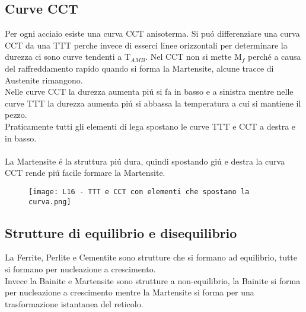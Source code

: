 \documentclass{article}
\begin{document}
{        \subsection{Curve CCT}
            Per ogni acciaio esiste una curva CCT anisoterma. Si pu\'o differenziare una curva CCT da una TTT perche invece di esserci linee orizzontali per determinare la durezza ci sono curve tendenti a T$_{AMB}$. Nel CCT non si mette M$_f$ perch\'e a causa del raffreddamento rapido quando si forma la Martensite, alcune tracce di Austenite rimangono.\\
            Nelle curve CCT la durezza aumenta pi\'u si fa in basso e a sinistra mentre nelle curve TTT la durezza aumenta pi\'u si abbassa la temperatura a cui si mantiene il pezzo.\\
            Praticamente tutti gli elementi di lega spostano le curve TTT e CCT a destra e in basso. \\ \\
            La Martensite \'e la struttura pi\'u dura, quindi spostando gi\'u e destra la curva CCT rende pi\'u facile formare la Martensite.
            \begin{figure}[h!]
                \centering
                \texttt{[image: L16 - TTT e CCT con elementi che spostano la curva.png]}
            \end{figure}
        \subsection{Strutture di equilibrio e disequilibrio}
            La Ferrite, Perlite e Cementite sono strutture che si formano ad equilibrio, tutte si formano per nucleazione a crescimento.\\
            Invece la Bainite e Martensite sono strutture a non-equilibrio, la Bainite si forma per nucleazione a crescimento mentre la Martensite si forma per una trasformazione istantanea del reticolo.
}
\end{document}
